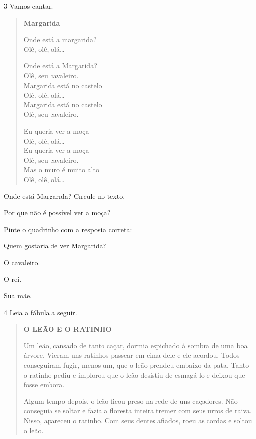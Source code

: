 \num{3} Vamos cantar.


\begin{verse}
\textbf{Margarida}

Onde está a margarida?\\
Olê, olê, olá…

Onde está a Margarida?\\
Olê, seu cavaleiro.\\
Margarida está no castelo\\
Olê, olê, olá…\\
Margarida está no castelo\\
Olê, seu cavaleiro.

Eu queria ver a moça\\
Olê, olê, olá…\\
Eu queria ver a moça\\
Olê, seu cavaleiro.\\
Mas o muro é muito alto\\
Olê, olê, olá…
\end{verse}


\begin{escolha}
\item Onde está Margarida? Circule no texto.

\item Por que não é possível ver a moça?


\item Pinte o quadrinho com a resposta correta:

Quem gostaria de ver Margarida?

\begin{boxlist}
\boxitem[] O cavaleiro.

\boxitem[] O rei.

\boxitem[] Sua mãe.
\end{boxlist}

\end{escolha}

\num{4} Leia a fábula a seguir.


\begin{quote}
\textbf{O LEÃO E O RATINHO}

Um leão, cansado de tanto caçar, dormia espichado à sombra de uma boa
árvore. Vieram uns ratinhos passear em cima dele e ele acordou. Todos
conseguiram fugir, menos um, que o leão prendeu embaixo da pata. Tanto o
ratinho pediu e implorou que o leão desistiu de esmagá-lo e deixou que
fosse embora.

Algum tempo depois, o leão ficou preso na rede de uns caçadores. Não
conseguia se soltar e fazia a floresta inteira tremer com seus urros de
raiva. Nisso, apareceu o ratinho. Com seus dentes afiados, roeu as
cordas e soltou o leão.
\end{quote}

